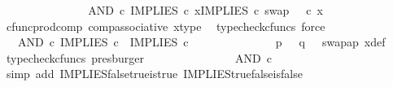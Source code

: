 \begin{isabellebody}
\ \ \ \ \ \ \ \ \ \ \isamarkupfalse%
\ \isamarkupfalse%
\ {\isachardoublequoteopen}{\isachardot}{\kern0pt}{\isachardot}{\kern0pt}{\isachardot}{\kern0pt}\ {\isacharequal}{\kern0pt}\ AND\ {\isasymcirc}\isactrlsub c\ {\isasymlangle}IMPLIES\ {\isasymcirc}\isactrlsub c\ x{\isacharcomma}{\kern0pt}IMPLIES\ {\isasymcirc}\isactrlsub c\ swap\ {\isasymOmega}\ {\isasymOmega}\ {\isasymcirc}\isactrlsub c\ x{\isasymrangle}{\isachardoublequoteclose}\isanewline
\ \ \ \ \ \ \ \ \ \ \ \ \isamarkupfalse%
\ cfunc{\isacharunderscore}{\kern0pt}prod{\isacharunderscore}{\kern0pt}comp\ comp{\isacharunderscore}{\kern0pt}associative{}\ x{\isacharunderscore}{\kern0pt}type\ \isamarkupfalse%
\ {\isacharparenleft}{\kern0pt}typecheck{\isacharunderscore}{\kern0pt}cfuncs{\isacharcomma}{\kern0pt}\ force{\isacharparenright}{\kern0pt}\isanewline
\ \ \ \ \ \ \ \ \ \ \isamarkupfalse%
\ \isamarkupfalse%
\ {\isachardoublequoteopen}{\isachardot}{\kern0pt}{\isachardot}{\kern0pt}{\isachardot}{\kern0pt}\ {\isacharequal}{\kern0pt}\ AND\ {\isasymcirc}\isactrlsub c\ {\isasymlangle}IMPLIES\ {\isasymcirc}\isactrlsub c\ {\isasymlangle}{\isasymf}{\isacharcomma}{\kern0pt}{\isasymt}{\isasymrangle}{\isacharcomma}{\kern0pt}\ IMPLIES\ {\isasymcirc}\isactrlsub c\ {\isasymlangle}{\isasymt}{\isacharcomma}{\kern0pt}{\isasymf}{\isasymrangle}{\isasymrangle}{\isachardoublequoteclose}\isanewline
\ \ \ \ \ \ \ \ \ \ \ \ \isamarkupfalse%
\ {\isacartoucheopen}p\ {\isacharequal}{\kern0pt}\ {\isasymf}{\isacartoucheclose}\ {\isacartoucheopen}q\ {\isacharequal}{\kern0pt}\ {\isasymt}{\isacartoucheclose}\ swap{\isacharunderscore}{\kern0pt}ap\ x{\isacharunderscore}{\kern0pt}def\ \isamarkupfalse%
\ {\isacharparenleft}{\kern0pt}typecheck{\isacharunderscore}{\kern0pt}cfuncs{\isacharcomma}{\kern0pt}\ presburger{\isacharparenright}{\kern0pt}\isanewline
\ \ \ \ \ \ \ \ \ \ \isamarkupfalse%
\ \isamarkupfalse%
\ {\isachardoublequoteopen}{\isachardot}{\kern0pt}{\isachardot}{\kern0pt}{\isachardot}{\kern0pt}\ {\isacharequal}{\kern0pt}\ AND\ {\isasymcirc}\isactrlsub c\ {\isasymlangle}{\isasymt}{\isacharcomma}{\kern0pt}\ {\isasymf}{\isasymrangle}{\isachardoublequoteclose}\isanewline
\ \ \ \ \ \ \ \ \ \ \ \ \isamarkupfalse%
\ {\isacharparenleft}{\kern0pt}simp\ add{\isacharcolon}{\kern0pt}\ IMPLIES{\isacharunderscore}{\kern0pt}false{\isacharunderscore}{\kern0pt}true{\isacharunderscore}{\kern0pt}is{\isacharunderscore}{\kern0pt}true\ IMPLIES{\isacharunderscore}{\kern0pt}true{\isacharunderscore}{\kern0pt}false{\isacharunderscore}{\kern0pt}is{\isacharunderscore}{\kern0pt}false{\isacharparenright}{\kern0pt}\isanewline

\end{isabellebody}
